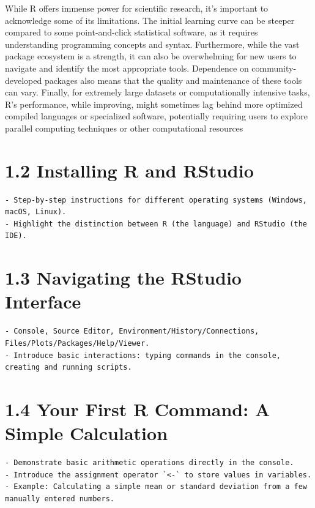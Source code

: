 \documentclass[
  letterpaper,
  DIV=11,
  numbers=noendperiod]{scrreprt}
\begin{document}
While R offers immense power for scientific research, it's important to
acknowledge some of its limitations. The initial learning curve can be
steeper compared to some point-and-click statistical software, as it
requires understanding programming concepts and syntax. Furthermore,
while the vast package ecosystem is a strength, it can also be
overwhelming for new users to navigate and identify the most appropriate
tools. Dependence on community-developed packages also means that the
quality and maintenance of these tools can vary. Finally, for extremely
large datasets or computationally intensive tasks, R's performance,
while improving, might sometimes lag behind more optimized compiled
languages or specialized software, potentially requiring users to
explore parallel computing techniques or other computational resources

\section{1.2 Installing R and RStudio}\label{installing-r-and-rstudio}

\begin{verbatim}
- Step-by-step instructions for different operating systems (Windows, macOS, Linux).
- Highlight the distinction between R (the language) and RStudio (the IDE).
\end{verbatim}

\section{1.3 Navigating the RStudio
Interface}\label{navigating-the-rstudio-interface}

\begin{verbatim}
- Console, Source Editor, Environment/History/Connections, Files/Plots/Packages/Help/Viewer.
- Introduce basic interactions: typing commands in the console, creating and running scripts.
\end{verbatim}

\section{1.4 Your First R Command: A Simple
Calculation}\label{your-first-r-command-a-simple-calculation}

\begin{verbatim}
- Demonstrate basic arithmetic operations directly in the console.
- Introduce the assignment operator `<-` to store values in variables.
- Example: Calculating a simple mean or standard deviation from a few manually entered numbers.
\end{verbatim}
\end{document}
